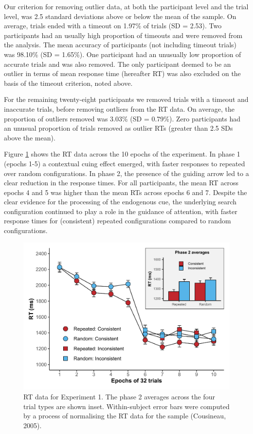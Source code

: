 \documentclass[
  man,floatsintext]{apa7}
\begin{document}
Our criterion for removing outlier data, at both the participant level and the trial level, was 2.5 standard deviations above or below the mean of the sample. On average, trials ended with a timeout on 1.97\% of trials (SD = 2.53). Two participants had an usually high proportion of timeouts and were removed from the analysis. The mean accuracy of participants (not including timeout trials) was 98.10\% (SD = 1.65\%). One participant had an unusually low proportion of accurate trials and was also removed. The only participant deemed to be an outlier in terms of mean response time (hereafter RT) was also excluded on the basis of the timeout criterion, noted above.

For the remaining twenty-eight participants we removed trials with a timeout and inaccurate trials, before removing outliers from the RT data. On average, the proportion of outliers removed was 3.03\% (SD = 0.79\%). Zero participants had an unusual proportion of trials removed as outlier RTs (greater than 2.5 SDs above the mean).



Figure \ref{fig:Exp1-RT-figure} shows the RT data across the 10 epochs of the experiment. In phase 1 (epochs 1-5) a contextual cuing effect emerged, with faster responses to repeated over random configurations. In phase 2, the presence of the guiding arrow led to a clear reduction in the response times. For all participants, the mean RT across epochs 4 and 5 was higher than the mean RTs across epochs 6 and 7. Despite the clear evidence for the processing of the endogenous cue, the underlying search configuration continued to play a role in the guidance of attention, with faster response times for (consistent) repeated configurations compared to random configurations.

\begin{figure}

{\centering \includegraphics{CCC_ms1_files/figure-latex/Exp1-RT-figure-1} 

}

\caption{RT data for Experiment 1. The phase 2 averages across the four trial types are shown inset. Within-subject error bars were computed by a process of normalising the RT data for the sample (Cousineau, 2005).}\label{fig:Exp1-RT-figure}
\end{figure}
\end{document}
